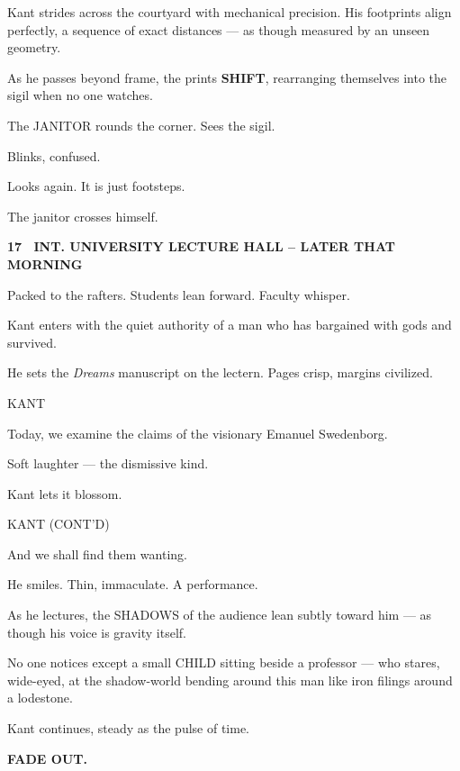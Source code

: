 \documentclass[12pt]{article}
\newcommand{\scene}[2]{%
  \vspace{1.8\baselineskip}%
  \noindent\textbf{#1 \ #2}\par\vspace{0.4\baselineskip}%
}
\newenvironment{dialogue}[1]{%
  \vspace{0.8\baselineskip}%
  \noindent\hspace*{2.3in}\textsc{#1}\par%
  \noindent\hspace*{1.5in}\begin{minipage}[t]{4.5in}%
}{%
  \end{minipage}\par%
}
\newcommand{\centered}[1]{%
  \vspace{0.8\baselineskip}%
  \begin{center}#1\end{center}%
}
\begin{document}
Kant strides across the courtyard with mechanical precision. His
footprints align perfectly, a sequence of exact distances --- as though
measured by an unseen geometry.

As he passes beyond frame, the prints \textbf{SHIFT}, rearranging themselves
into the sigil when no one watches.

The JANITOR rounds the corner. Sees the sigil.

Blinks, confused.

Looks again. It is just footsteps.

The janitor crosses himself.


\scene{17}{INT. UNIVERSITY LECTURE HALL -- LATER THAT MORNING}

Packed to the rafters. Students lean forward. Faculty whisper.

Kant enters with the quiet authority of a man who has bargained with
gods and survived.

He sets the \emph{Dreams} manuscript on the lectern. Pages crisp, margins
civilized.

\begin{dialogue}{KANT}
Today, we examine the claims of the visionary Emanuel Swedenborg.
\end{dialogue}

Soft laughter --- the dismissive kind.

Kant lets it blossom.

\begin{dialogue}{KANT (CONT'D)}
And we shall find them wanting.
\end{dialogue}

He smiles. Thin, immaculate. A performance.

As he lectures, the SHADOWS of the audience lean subtly toward him ---
as though his voice is gravity itself.

No one notices except a small CHILD sitting beside a professor --- who
stares, wide-eyed, at the shadow-world bending around this man like
iron filings around a lodestone.

Kant continues, steady as the pulse of time.

\centered{\textbf{FADE OUT.}}

\end{document}
